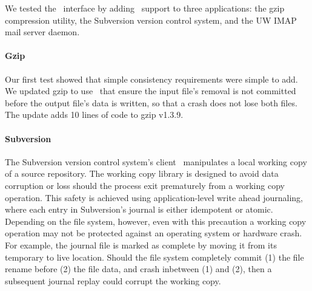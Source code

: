 
We tested the \patchgroup\ interface by adding \patchgroup\ support to three
applications: the gzip compression utility, the Subversion version control
system, and the UW IMAP mail server daemon.


\paragraph{Gzip}
\label{sec:patchgroup:gzip}

Our first test showed that simple consistency requirements were simple to
add.  We updated gzip to use \patchgroups\ that ensure the input file's
removal is not committed before the output file's data is written, so that
a crash does not lose both files. The update adds 10 lines of code to gzip
v1.3.9.
%

\paragraph{Subversion}
\label{sec:patchgroup:svn}


The Subversion version control system's client~\cite{svn} manipulates a
local working copy of a source repository.
%
The working copy library is designed to avoid data corruption or loss
should the process exit prematurely from a working copy operation.
%
This safety is achieved using application-level write ahead journaling,
where each entry in Subversion's journal is either idempotent or
atomic.
%
Depending on the file system, however, even with this precaution a
working copy operation may not be protected against an operating
system or hardware crash.
%
For example, the journal file is marked as complete by moving it from
its temporary to live location.
%
Should the file system completely commit (1) the file rename before
(2) the file data, and crash inbetween (1) and (2), then a subsequent
journal replay could corrupt the working copy.

